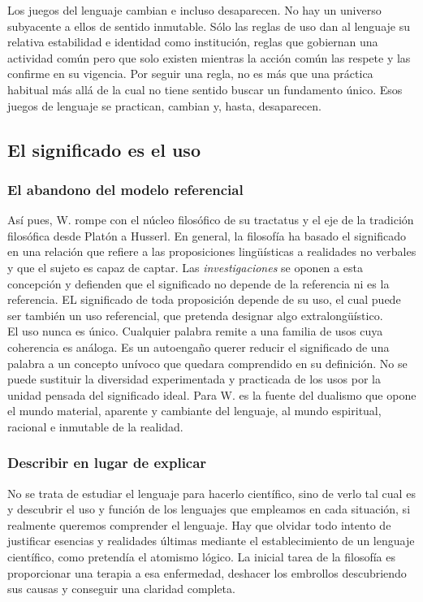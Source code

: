 \documentclass[a4paper, 11pt, twocolumn, spanish]{article}
\begin{document}
Los juegos del lenguaje cambian e incluso desaparecen. No hay un
universo subyacente a ellos de sentido inmutable. Sólo las reglas de
uso dan al lenguaje su relativa estabilidad e identidad como
institución, reglas que gobiernan una actividad común pero que solo
existen mientras la acción común las respete y las confirme en su
vigencia. Por seguir una regla, no es más que una práctica habitual
más allá de la cual no tiene sentido buscar un fundamento único. Esos
juegos de lenguaje se practican, cambian y, hasta, desaparecen.\\

\subsection{El significado es el uso}
\label{sec:org127a730}
\subsubsection{El abandono del modelo referencial}
\label{sec:orgc2282ca}
Así pues, W. rompe con el núcleo filosófico de su tractatus y el eje
de la tradición filosófica desde Platón a Husserl. En general, la
filosofía ha basado el significado en una relación que refiere a las
proposiciones lingüísticas a realidades no verbales y que el sujeto es
capaz de captar. Las \emph{investigaciones} se oponen a esta concepción y
defienden que el significado no depende de la referencia ni es la
referencia. EL significado de toda proposición depende de su uso, el
cual puede ser también un uso referencial, que pretenda designar algo
extralongüístico.\\

El uso nunca es único. Cualquier palabra remite a una familia de usos
cuya coherencia es análoga. Es un autoengaño querer reducir el
significado de una palabra a un concepto unívoco que quedara
comprendido en su definición. No se puede sustituir la diversidad
experimentada y practicada de los usos por la unidad pensada del
significado ideal. Para W. es la fuente del dualismo que opone el
mundo material, aparente y cambiante del lenguaje, al mundo
espiritual, racional e inmutable de la realidad.

\subsubsection{Describir en lugar de explicar}
\label{sec:orge40cf84}
No se trata de estudiar el lenguaje para hacerlo científico, sino de
verlo tal cual es y descubrir el uso y función de los lenguajes que
empleamos en cada situación, si realmente queremos comprender el
lenguaje. Hay que olvidar todo intento de justificar esencias y
realidades últimas mediante el establecimiento de un lenguaje
científico, como pretendía el atomismo lógico. La inicial tarea de la
filosofía es proporcionar una terapia a esa enfermedad, deshacer los
embrollos descubriendo sus causas y conseguir una claridad completa.\\
\end{document}

